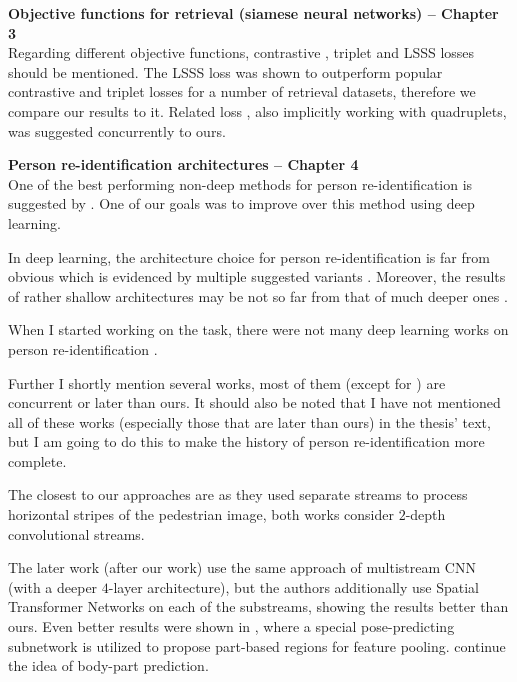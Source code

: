 \documentclass[a4paper, 11pt, oneside]{Thesis}  %
\begin{document}
\textbf{Objective functions for retrieval (siamese neural networks) -- Chapter 3}\\
Regarding different objective functions, contrastive \citep{Chopra05}, triplet \citep{SchroffKP15} and LSSS  \citep{Song16} losses should be mentioned. The LSSS loss was shown to outperform popular contrastive and triplet losses for a number of retrieval datasets, therefore we compare our results to it. Related loss \citep{Tadmor2016LearningAM}, also implicitly working with quadruplets, was suggested concurrently to ours.



\textbf{Person re-identification architectures -- Chapter 4}\\
One of the best performing non-deep methods for person re-identification is suggested by \citet{paisitkriangkrai2015learning}. One of our goals was to improve over this method using deep learning.

In deep learning, the architecture choice for person re-identification is far from obvious which is evidenced by multiple suggested variants \citep{Yi14,Li14, ahmed2015improved, wu2016personnet,VariorHW16, VariorSLXW16,cheng2016person,li2017learning, zhao2017spindle,saquib2018pose, suh2018part, kalayeh2018human}. Moreover, the results of rather shallow architectures \citep{Yi14} may be not so far from that of much deeper ones \citep{VariorHW16}.

When I started working on the task, there were not many deep learning works on person re-identification \citep{Yi14,Li14,ahmed2015improved}.

Further I shortly mention several works, most of them (except for \citep{Yi14,Li14,ahmed2015improved}) are concurrent or later than ours. It should also be noted that I have not mentioned all of these works (especially those that are later than ours) in the thesis' text, but I am going to do this to make the history of person re-identification more  complete.

The closest to our approaches are \citep{Yi14,cheng2016person} as they used separate streams to process horizontal stripes of the pedestrian image, both works consider $2$-depth convolutional streams.


The later work \citep{li2017learning} (after our work) use the same approach of multistream CNN (with a deeper $4$-layer architecture), but the authors additionally use Spatial Transformer Networks on each of the substreams, showing the results better than ours. Even better results were shown in \citep{zhao2017spindle}, where a special pose-predicting subnetwork is utilized to propose part-based regions for feature pooling. \citep{saquib2018pose, suh2018part, kalayeh2018human} continue the idea of body-part prediction.
\end{document}
